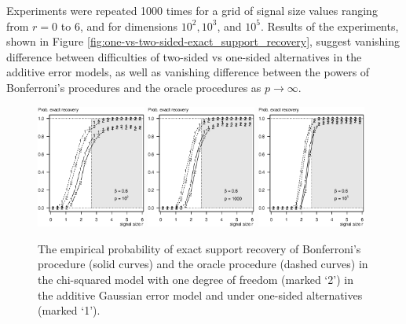 Experiments were repeated 1000 times for a grid of signal size values ranging from $r=0$ to $6$, and for dimensions $10^2, 10^3$, and $10^5$.
Results of the experiments, shown in Figure \ref{fig:one-vs-two-sided-exact_support_recovery}, suggest vanishing difference between difficulties of two-sided vs one-sided alternatives in the additive error models, as well as vanishing difference between the powers of Bonferroni's procedures and the oracle procedures as $p\to\infty$.

\begin{figure}
      \centering
      \includegraphics[width=0.32\textwidth]{sim_one-vs-two-sided/exact_recovery_one-vs-two-sided_beta06_p100.eps}
      \includegraphics[width=0.32\textwidth]{sim_one-vs-two-sided/exact_recovery_one-vs-two-sided_beta06_p1000.eps}
      \includegraphics[width=0.32\textwidth]{sim_one-vs-two-sided/exact_recovery_one-vs-two-sided_beta06_p100000.eps}
      \caption{The empirical probability of exact support recovery of Bonferroni's procedure (solid curves) and the oracle procedure (dashed curves) in the chi-squared model with one degree of freedom (marked `2') in the additive Gaussian error model and under one-sided alternatives (marked `1'). 
}
\end{figure}
